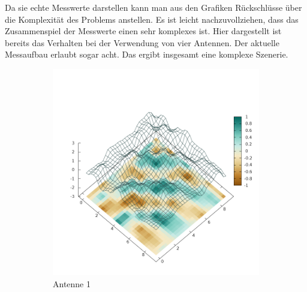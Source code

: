 Da sie echte Messwerte darstellen kann man aus den Grafiken Rückschlüsse über die Komplexität des Problems anstellen. Es ist leicht nachzuvollziehen, dass das Zusammenspiel der Messwerte einen sehr komplexes ist. Hier dargestellt ist bereits das Verhalten bei der Verwendung von vier Antennen. Der aktuelle Messaufbau erlaubt sogar acht. Das ergibt insgesamt eine komplexe Szenerie.\\
%
\begin{figure}[ht!]
        \centering
        \begin{subfigure}[b]{0.4\textwidth}
            \centering
            \includegraphics[width=\textwidth]{img/Plate0_A1.png}
            \caption[lorem]{Antenne 1}
            \label{fig:Plate0_A1}
        \end{subfigure}%
\\
        \begin{subfigure}[b]{0.4\textwidth}
            \centering

\end{subfigure}
\end{figure}
